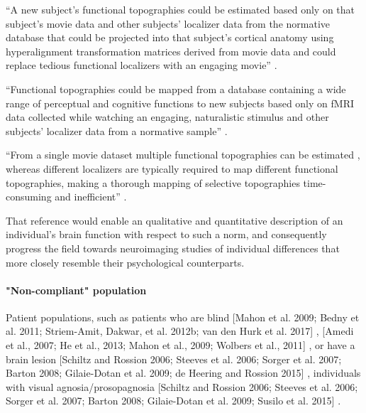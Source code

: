 %
``A new subject's functional topographies could be estimated based only on that
subject's movie data and other subjects' localizer data from the normative
database that could be projected into that subject's cortical anatomy using
hyperalignment transformation matrices derived from movie data and could replace
tedious functional localizers with an engaging movie''
\citep{jiahui2020predicting}.

%
``Functional topographies could be mapped from a database containing a wide
range of perceptual and cognitive functions to new subjects based only on fMRI
data collected while watching an engaging, naturalistic stimulus and other
subjects' localizer data from a normative sample'' \citep{jiahui2020predicting}.

``From a single movie dataset multiple functional topographies can be estimated
\citep{guntupalli2016model}, whereas different localizers are typically required
to map different functional topographies, making a thorough mapping of selective
topographies time-consuming and inefficient'' \citep{jiahui2020predicting}.

%
That reference would enable an qualitative and quantitative description of an
individual's brain function with respect to such a norm, and consequently
progress the field towards neuroimaging studies of individual differences that
more closely resemble their psychological counterparts.

\paragraph{"Non-compliant" population}


%
Patient populations, such as patients who
%
are blind
%
[Mahon et al. 2009; Bedny et al. 2011; Striem-Amit, Dakwar, et al.  2012b; van
den Hurk et al. 2017] \citep{rosenke2021probabilistic},
%
[Amedi et al., 2007; He et al., 2013; Mahon et al., 2009; Wolbers et al., 2011]
\citep{weiner2018defining}, or
%
have a brain lesion
%
[Schiltz and Rossion 2006; Steeves et al. 2006; Sorger et al. 2007; Barton 2008;
Gilaie-Dotan et al.  2009; de Heering and Rossion 2015]
\citep{rosenke2021probabilistic},
%
individuals with visual agnosia/prosopagnosia
%
[Schiltz and Rossion 2006; Steeves et al. 2006; Sorger et al. 2007; Barton 2008;
Gilaie-Dotan et al. 2009; Susilo et al. 2015] \citep{rosenke2021probabilistic}.


